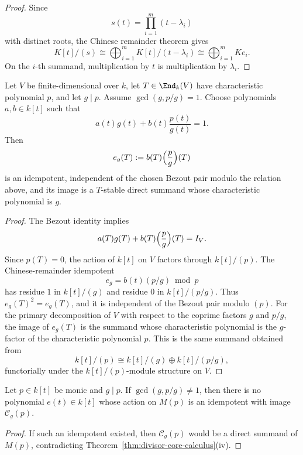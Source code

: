 \begin{proof}
Since
\[
s(t)=\prod_{i=1}^m (t-\lambda_i)
\]
with distinct roots, the Chinese remainder theorem gives
\[
K[t]/(s)\cong \bigoplus_{i=1}^m K[t]/(t-\lambda_i)\cong \bigoplus_{i=1}^m K e_i.
\]
On the \(i\)-th summand, multiplication by \(t\) is multiplication by \(\lambda_i\).
\end{proof}

\begin{proposition}
\label{prop:coprime-functional-calculus}
Let \(V\) be finite-dimensional over \(k\), let \(T\in \End_k(V)\) have characteristic polynomial \(p\), and let \(g\mid p\).
Assume \(\gcd(g,p/g)=1\).
Choose polynomials \(a,b\in k[t]\) such that
\[
a(t)g(t)+b(t)\frac{p(t)}{g(t)}=1.
\]
Then
\[
e_g(T):=b(T)\Bigl(\frac{p}{g}\Bigr)(T)
\]
is an idempotent, independent of the chosen Bezout pair modulo the relation above, and its image is a \(T\)-stable direct summand whose characteristic polynomial is \(g\).
\end{proposition}

\begin{proof}
The Bezout identity implies
\[
a(T)g(T)+b(T)\Bigl(\frac{p}{g}\Bigr)(T)=I_V.
\]
Since \(p(T)=0\), the action of \(k[t]\) on \(V\) factors through \(k[t]/(p)\).
The Chinese-remainder idempotent
\[
e_g=b(t)(p/g)\bmod p
\]
has residue \(1\) in \(k[t]/(g)\) and residue \(0\) in \(k[t]/(p/g)\).
Thus \(e_g(T)^2=e_g(T)\), and it is independent of the Bezout pair modulo \((p)\).
For the primary decomposition of \(V\) with respect to the coprime factors \(g\) and \(p/g\),
the image of \(e_g(T)\) is the summand whose characteristic polynomial is the
\(g\)-factor of the characteristic polynomial \(p\).
This is the same summand obtained from
\[
k[t]/(p)\cong k[t]/(g)\oplus k[t]/(p/g),
\]
functorially under the \(k[t]/(p)\)-module structure on \(V\).
\end{proof}

\begin{proposition}
\label{prop:no-projector}
Let \(p\in k[t]\) be monic and \(g\mid p\).
If \(\gcd(g,p/g)\neq 1\), then there is no polynomial \(e(t)\in k[t]\) whose action on \(M(p)\) is an idempotent with image \(\mathcal C_g(p)\).
\end{proposition}

\begin{proof}
If such an idempotent existed, then \(\mathcal C_g(p)\) would be a direct summand of \(M(p)\), contradicting Theorem~\ref{thm:divisor-core-calculus}\textup{(iv)}.
\end{proof}

